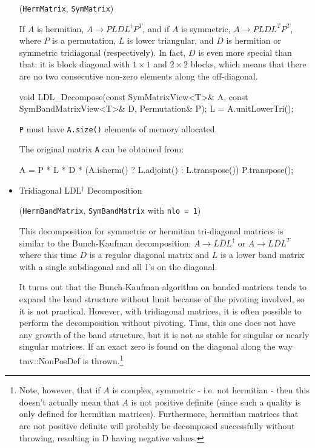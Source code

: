 \documentclass[twoside,letterpaper,11pt]{article}
\renewcommand{\tt}[1]{{\lstinline {#1}}}
\begin{document}
\begin{itemize}
(\tt{HermMatrix}, \tt{SymMatrix})

If $A$ is hermitian, $A \rightarrow P L D L^\dagger P^T$,
and if $A$ is symmetric, $A \rightarrow P L D L^T P^T$, where $P$ is a permutation,
$L$ is lower triangular, and $D$ is hermitian or symmetric tridiagonal (respectively).  
In fact, $D$ is even more special than that: it is block diagonal with $1 \times 1$
and $2 \times 2$ blocks,
which means that there are no two consecutive
non-zero elements along the off-diagonal.

\begin{tmvcode}
void LDL_Decompose(const SymMatrixView<T>& A, 
      const SymBandMatrixView<T>& D, Permutation& P);
L = A.unitLowerTri();
\end{tmvcode}
\tt{P} must have \tt{A.size()} elements of memory allocated.

The original matrix \tt{A} can be obtained from:
\begin{tmvcode}
A = P * L * D * (A.isherm() ? L.adjoint() : L.transpose())
        P.transpose();
\end{tmvcode}

\item Tridiagonal LDL$^\dagger$ Decomposition 

(\tt{HermBandMatrix}, \tt{SymBandMatrix} with \tt{nlo = 1})

This decomposition for symmetric or hermitian tri-diagonal matrices is 
similar to the Bunch-Kaufman decomposition: 
$A \rightarrow L D L^\dagger$
or $A \rightarrow L D L^T$ where this time $D$ is a regular diagonal matrix and $L$ is
a lower band matrix with a single subdiagonal and all 1's on the diagonal.

It turns out
that the Bunch-Kaufman algorithm on banded matrices tends to expand the band structure
without limit because of the pivoting involved, so it is not practical.
However, with tridiagonal matrices, it is often possible to perform the 
decomposition without pivoting.  Thus, this one does not have any growth of the band structure,
but it is not as stable for singular or nearly singular matrices.
If an exact zero is found on the diagonal along the way
tmv::NonPosDef is thrown.\footnote{
Note, however, that if $A$ is complex, symmetric - i.e. not hermitian -
then this doesn't actually mean that $A$ is not positive definite (since such a 
quality is only defined for hermitian matrices).  Furthermore, 
hermitian matrices that are not positive definite will probably be decomposed successfully
without throwing, resulting in D having negative values.

}
\end{itemize}
\end{document}
